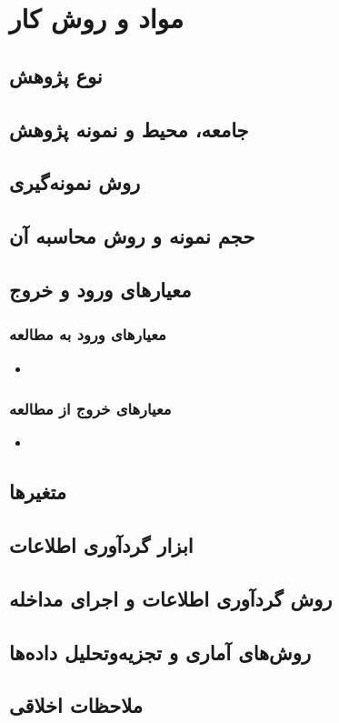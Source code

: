 \ChapterStart
\chapter{مواد و روش کار}
\section{نوع پژوهش}

\section{جامعه، محیط و نمونه پژوهش}

\section{روش نمونه‌گیری}

\section{حجم نمونه و روش محاسبه آن}

\section{معیارهای ورود و خروج}
\subsection{معیارهای ورود به مطالعه}
\begin{itemize}
  \item
\end{itemize}

\subsection{معیارهای خروج از مطالعه}
\begin{itemize}
  \item
\end{itemize}

\section{متغیرها}


\section{ابزار گردآوری اطلاعات}

\section{روش گردآوری اطلاعات و اجرای مداخله}

\section{روش‌های آماری و تجزیه‌وتحلیل داده‌ها}

\section{ملاحظات اخلاقی}
